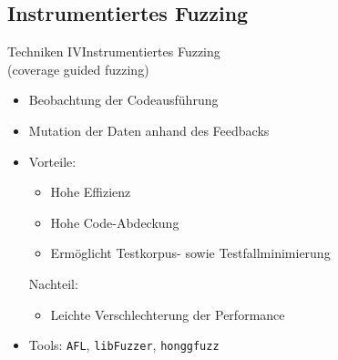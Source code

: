 \documentclass[ngerman,aspectratio=1610,12pt]{beamer}
\begin{document}
\subsection*{Instrumentiertes Fuzzing}
\begin{frame}{Techniken IV}{Instrumentiertes Fuzzing \\{\large (coverage guided fuzzing)}}
  \begin{itemize}
    \item Beobachtung der Codeausführung
    \item Mutation der Daten anhand des Feedbacks
    \item Vorteile:
    \begin{itemize}
      \item Hohe Effizienz
      \item Hohe Code-Abdeckung
      \item Ermöglicht Testkorpus- sowie Testfallminimierung
    \end{itemize}
    Nachteil:
    \begin{itemize}
      \item Leichte Verschlechterung der Performance
    \end{itemize}
    \item Tools: \texttt{AFL}, \texttt{libFuzzer}, \texttt{honggfuzz}
  \end{itemize}
\end{frame}
\end{document}
